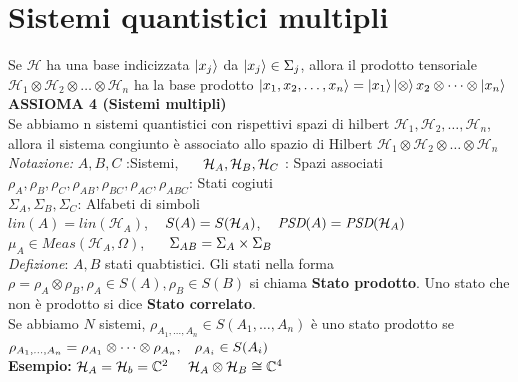 \documentclass{report}
\begin{document}
\section{Sistemi quantistici multipli}
Se $\mathcal{H}$ ha una base indicizzata $\ket{x_j}$ da $\ket{x_j}\in \Sigma_j$, allora il prodotto tensoriale $\mathcal{H}_1\otimes\mathcal{H}_2\otimes\dots\otimes\mathcal{H}_n$ ha la base prodotto $\ket{x_1,x_2,\dots,x_n}=\ket{x_1}\ket\otimes{x_2}\otimes\dots\otimes\ket{x_n}$
\medskip
\\ \textbf{ASSIOMA 4 (Sistemi multipli)}
\\Se abbiamo n sistemi quantistici con rispettivi spazi di hilbert $\mathcal{H}_1,\mathcal{H}_2,\dots,\mathcal{H}_n$, allora il sistema congiunto è associato allo spazio di Hilbert $\mathcal{H}_1\otimes\mathcal{H}_2\otimes\dots\otimes\mathcal{H}_n$
\medskip
\\ \textit{Notazione:} $A,B,C $ :Sistemi, $\hspace{0.5cm}\mathcal{H}_A,\mathcal{H}_B,\mathcal{H}_C$ : Spazi associati
\medskip
\\ $\rho_A,\rho_B,\rho_C,\rho_{AB},\rho_{BC},\rho_{AC},\rho_{ABC}$: Stati cogiuti
\medskip
\\$\Sigma_A,\Sigma_B,\Sigma_C$: Alfabeti di simboli
\medskip
\\ $\textit{lin}(A)= \textit{lin}(\mathcal{H}_A)$, $\hspace{0.3cm}S(A) = S(\mathcal{H}_A)$, $\hspace{0.3cm}\textit{PSD}(A)= \textit{PSD}(\mathcal{H}_A)$
\medskip
\\ $\mu_A\in\textit{Meas}(\mathcal{H}_A,\Omega)$, $\hspace{0.5cm}\Sigma_{AB}= \Sigma_A\times\Sigma_B$
\medskip
\\ \textit{Defizione}: $A,B$ stati quabtistici. Gli stati  nella forma $\rho=\rho_A\otimes\rho_B,\rho_A\in S(A),\rho_B\in S(B)$ si chiama \textbf{Stato prodotto}. Uno stato che non è prodotto si dice \textbf{Stato correlato}.
\\Se abbiamo $N$ sistemi, $\rho_{A_1,\dots,A_n}\in S(A_1,\dots,A_n)$ è uno stato prodotto se $\rho_{A_1,\dots,A_n}=\rho_{A_1}\otimes\dots\otimes\rho_{A_n},\hspace{0.3cm}\rho_{A_i}\in S(A_i)$
\medskip
\\ \textbf{Esempio:} $\mathcal{H}_A = \mathcal{H}_b = \mathbb{C}^2 \hspace{0.5cm} \mathcal{H}_A\otimes\mathcal{H}_B \cong
\mathbb{C}^4$
\end{document}
